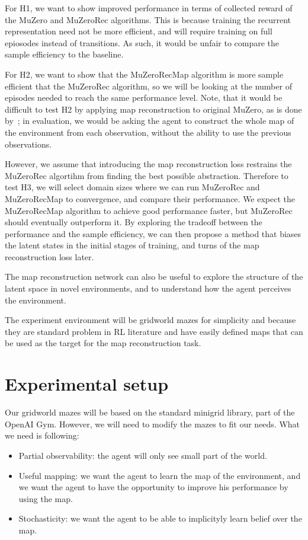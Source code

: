 \documentclass[12pt]{article}
\begin{document}
For H1, we want to show improved performance in terms of collected reward of the MuZero and MuZeroRec algorithms. This is because training the recurrent representation need not be more efficient, and will require training on full epiosodes instead of transitions. As such, it would be unfair to compare the sample efficiency to the baseline. 

For H2, we want to show that the MuZeroRecMap algorithm is more sample efficient that the MuZeroRec algorithm, so we will be looking at the number of episodes needed to reach the same performance level.
Note, that it would be difficult to test H2 by applying map reconstruction to original MuZero, as is done by~\cite{fangSLAMuZeroPlanLearn2024}; in evaluation, we would be asking the agent to construct the whole map of the environment from each observation, without the ability to use the previous observations. 

However, we assume that introducing the map reconstruction loss restrains the MuZeroRec algortihm from finding the best possible abstraction. 
Therefore to test H3, we will select domain sizes where we can run MuZeroRec and MuZeroRecMap to convergence, and compare their performance.  
We expect the MuZeroRecMap algorithm to achieve good performance faster, but MuZeroRec should eventually outperform it. 
By exploring the tradeoff between the performance and the sample efficiency, we can then propose a method that biases the latent states in the initial stages of training, and turns of the map reconstruction loss later.

The map reconstruction network can also be useful to explore the structure of the latent space in novel environments, and to understand how the agent perceives the environment.

The experiment environment will be gridworld mazes for simplicity and because they are standard problem in RL literature and have easily defined maps that can be used as the target for the map reconstruction task.

\section{Experimental setup}
Our gridworld mazes will be based on the standard minigrid library, part of the OpenAI Gym. However, we will need to modify the mazes to fit our needs. 
What we need is following:

\begin{itemize}
    \item Partial observability: the agent will only see small part of the world.
    \item Useful mapping: we want the agent to learn the map of the environment, and we want the agent to have the opportunity to improve his performance by using the map.
    \item Stochasticity: we want the agent to be able to implicityly learn belief over the map. 
\end{itemize}
\end{document}
